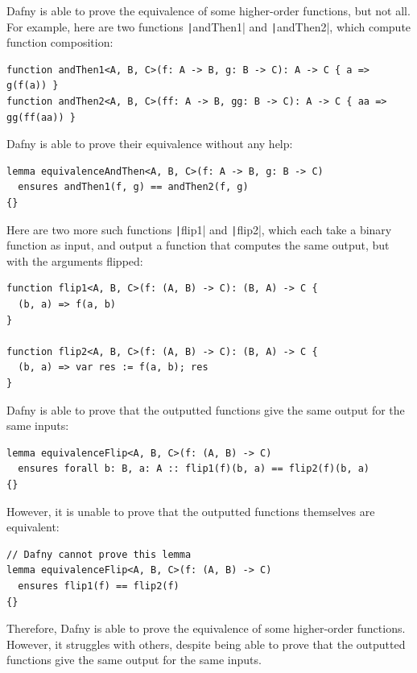 Dafny is able to prove the equivalence of some higher-order functions, but not all. For example, here are two functions \texttt|andThen1| and \texttt|andThen2|, which compute function composition:
\begin{verbatim}
function andThen1<A, B, C>(f: A -> B, g: B -> C): A -> C { a => g(f(a)) }
function andThen2<A, B, C>(ff: A -> B, gg: B -> C): A -> C { aa => gg(ff(aa)) }
\end{verbatim}
%
Dafny is able to prove their equivalence without any help:
\begin{verbatim}
lemma equivalenceAndThen<A, B, C>(f: A -> B, g: B -> C)
  ensures andThen1(f, g) == andThen2(f, g)
{}
\end{verbatim}
%
Here are two more such functions \texttt|flip1| and \texttt|flip2|, which each take a binary function as input, and output a function that computes the same output, but with the arguments flipped:
\begin{verbatim}
function flip1<A, B, C>(f: (A, B) -> C): (B, A) -> C {
  (b, a) => f(a, b)
}

function flip2<A, B, C>(f: (A, B) -> C): (B, A) -> C {
  (b, a) => var res := f(a, b); res
}
\end{verbatim}
%
Dafny is able to prove that the outputted functions give the same output for the same inputs:
\begin{verbatim}
lemma equivalenceFlip<A, B, C>(f: (A, B) -> C)
  ensures forall b: B, a: A :: flip1(f)(b, a) == flip2(f)(b, a)
{}
\end{verbatim}
%
However, it is unable to prove that the outputted functions themselves are equivalent:
\begin{verbatim}
// Dafny cannot prove this lemma
lemma equivalenceFlip<A, B, C>(f: (A, B) -> C)
  ensures flip1(f) == flip2(f)
{}
\end{verbatim}
%

Therefore, Dafny is able to prove the equivalence of some higher-order functions. However, it struggles with others, despite being able to prove that the outputted functions give the same output for the same inputs.
